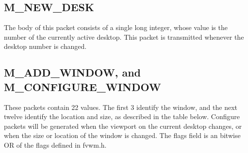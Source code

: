 \subsection{M\_NEW\_DESK}
The body of this packet consists of a single long integer, whose value
is the number of the currently active desktop. This packet is
transmitted whenever the desktop number is changed.

\subsection{M\_ADD\_WINDOW, and M\_CONFIGURE\_WINDOW}
These packets contain 22 values. The first 3 identify the window, and
the next twelve identify the location and size, as described in the
table below. Configure packets will be generated when the
viewport on the current desktop changes, or when the size or location
of the window is changed. The flags field is an bitwise OR of the
flags defined in fvwm.h.



